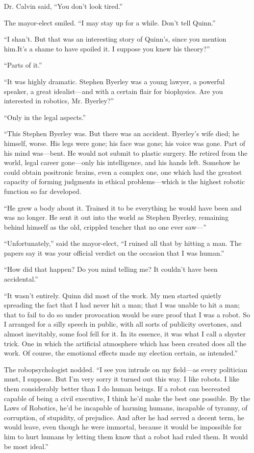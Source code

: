 \documentclass[10pt,a5paper,twoside]{book}
\begin{document}
Dr. Calvin said, “You don’t look tired.”

The mayor-elect smiled. “I may stay up for a while. Don’t tell Quinn.”

“I shan’t. But that was an interesting story of Quinn’s, since you mention him.It’s a shame to have spoiled it. I suppose you knew his theory?”

“Parts of it.”

“It was highly dramatic. Stephen Byerley was a young lawyer, a powerful speaker, a great idealist—and with a certain flair for biophysics. Are you interested in robotics, Mr. Byerley?”

“Only in the legal aspects.”

“This Stephen Byerley was. But there was an accident. Byerley’s wife died; he himself, worse. His legs were gone; his face was gone; his voice was gone. Part of his mind was—bent. He would not submit to plastic surgery. He retired from the world, legal career gone—only his intelligence, and his hands left. Somehow he could obtain positronic brains, even a complex one, one which had the greatest capacity of forming judgments in ethical problems—which is the highest robotic function so far developed.

“He grew a body about it. Trained it to be everything he would have been and was no longer. He sent it out into the world as Stephen Byerley, remaining behind himself as the old, crippled teacher that no one ever saw—”

“Unfortunately,” said the mayor-elect, “I ruined all that by hitting a man. The papers say it was your official verdict on the occasion that I was human.”

“How did that happen? Do you mind telling me? It couldn’t have been accidental.”

“It wasn’t entirely. Quinn did most of the work. My men started quietly spreading the fact that I had never hit a man; that I was unable to hit a man; that to fail to do so under provocation would be sure proof that I was a robot. So I arranged for a silly speech in public, with all sorts of publicity overtones, and almost inevitably, some fool fell for it. In its essence, it was what I call a shyster trick. One in which the artificial atmosphere which has been created does all the work. Of course, the emotional effects made my election certain, as intended.”

The robopsychologist nodded. “I see you intrude on my field—as every politician must, I suppose. But I’m very sorry it turned out this way. I like robots. I like them considerably better than I do human beings. If a robot can becreated capable of being a civil executive, I think he’d make the best one possible. By the Laws of Robotics, he’d be incapable of harming humans, incapable of tyranny, of corruption, of stupidity, of prejudice. And after he had served a decent term, he would leave, even though he were immortal, because it would be impossible for him to hurt humans by letting them know that a robot had ruled them. It would be most ideal.”
\end{document}
